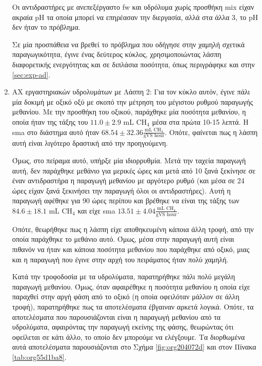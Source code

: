\documentclass[11pt]{report}
\begin{document}
\begin{enumerate}
Οι αντιδραστήρες με ανεπεξέργαστο \acrshort{fw} και υδρόλυμα χωρίς προσθήκη \acrshort{mix} είχαν ακραία pH τα οποία μπορεί να επηρέασαν την διεργασία, αλλά στα άλλα 3, το pH δεν ήταν το πρόβλημα.

Σε μία προσπάθεια να βρεθεί το πρόβλημα που οδήγησε στην χαμηλή σχετικά παραγωγικότητα, έγινε ένας δεύτερος κύκλος, χρησιμοποιώντας λάσπη διαφορετικής ενεργότητας και σε διπλάσια ποσότητα, όπως περιγράφηκε και στην \autoref{sec:exp-ad}.

\item ΑΧ εργαστηριακών υδρολυμάτων με Λάσπη 2:
\label{sec:org30759da}
Για τον κύκλο αυτόν, έγινε πάλι μία δοκιμή με οξικό οξύ με σκοπό την μέτρηση του μέγιστου ρυθμού παραγωγής μεθανίου. Με την προσθήκη του οξικού, παράχθηκε μία ποσότητα μεθανίου, η οποία ήταν της τάξης του \(11.0 \pm 2.9 \text{ mL CH$_4$}\) μέσα στα πρώτα 10-15 λεπτά. H \acrshort{sma} στο διάστημα αυτό ήταν \(68.54 \pm 32.36 \frac{\text{mL CH$_4$}}{\text{gVS hour}}\). Οπότε, φαίνεται πως η λάσπη αυτή είναι λιγότερο δραστική από την προηγούμενη.

Όμως, στο πείραμα αυτό, υπήρξε μία ιδιορρυθμία. Μετά την ταχεία παραγωγή αυτή, δεν παράχθηκε μεθάνιο για μερικές ώρες και μετά από 10 ξανά ξεκίνησε σε έναν αντιδραστήρα η παραγωγή μεθανίου με αργότερο ρυθμό (και μέσα σε 24 ώρες είχαν ξανά ξεκινήσει την παραγωγή όλοι οι αντιδραστήρες). Αυτή η παραγωγή αφέθηκε για 90 ώρες περίπου και βρέθηκε να είναι της τάξης των \(84.6 \pm 18.1 \text{ mL CH$_4$}\) και είχε \acrshort{sma} \(13.51 \pm 4.04 \frac{\text{mL CH$_4$}}{\text{gVS hour}}\).

Οπότε, θεωρήθηκε πως η λάσπη είχε αποθηκευμένη κάποια άλλη τροφή, από την οποία παράχθηκε το μεθάνιο αυτό. Όμως, μέσα στην παραγωγή αυτή είναι πιθανόν να ήταν και κάποια ποσότητα μεθανίου που παράχθηκε από οξικό, μιας και η παραγωγή που έγινε στην αρχή του πειράματος ήταν πολύ χαμηλή.

Κατά την τροφοδοσία με τα υδρολύματα, παρατηρήθηκε πάλι πολύ μεγάλη παραγωγή μεθανίου. Όμως, όταν αφαιρέθηκε η ποσότητα μεθανίου η οποία είχε παραχθεί στην αργή φάση από το οξικό (η οποία οφειλόταν μάλλον σε άλλη τροφή), παρατηρήθηκε πως τα αποτελέσματα έβγαιναν αρκετά λογικά. Οπότε, τα αποτελέσματα που παρουσιάζονται είναι η παραγωγή μεθανίου από τα υδρολύματα, αφαιρόντας την παραγωγή εκείνης της φάσης, θεωρώντας ότι οφείλεται σε κάτι άλλο, το οποίο δεν μπορούμε να ελέγξουμε. Τα διορθωμένα αυτά αποτελέσματα παρουσιάζονται στο Σχήμα \ref{fig:org204072d} και στον Πίνακα \ref{tab:org55d1ba8}.


\end{enumerate}
\end{document}
